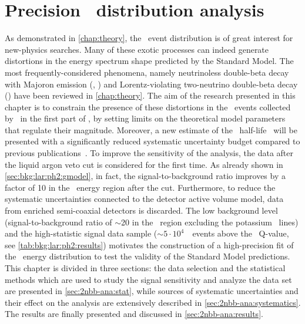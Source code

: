 
\chapter{\texorpdfstring{Precision \nnbb\ distribution analysis}{Precision 2νββ distribution analysis}}%
\label{chap:2nbb-ana}

As demonstrated in \cref{chap:theory}, the \nnbb\ event distribution is of
great interest for new-physics searches. Many of these exotic processes can indeed
generate distortions in the energy spectrum shape predicted by the Standard Model. The
most frequently-considered phenomena, namely neutrinoless double-beta decay with Majoron
emission (\onbbx, \onbbxx) and Lorentz-violating two-neutrino double-beta decay (\nnbblv)
have been reviewed in \cref{chap:theory}. The aim of the research presented in this
chapter is to constrain the presence of these distortions in the \nnbb\ events collected
by \gerda\ in the first part of \phasetwo, by setting limits on the theoretical model
parameters that regulate their magnitude. Moreover, a new estimate of the \nnbb\ half-life
\thalftwo\ will be presented with a significantly reduced systematic uncertainty budget
compared to previous publications~\cite{Agostini2015a}. To improve the sensitivity of the
analysis, the data after the liquid argon veto cut is considered for the first time. As
already shown in \cref{sec:bkg:lar:ph2:gmodel}, in fact, the signal-to-background ratio
improves by a factor of 10 in the \nnbb\ energy region after the cut. Furthermore, to
reduce the systematic uncertainties connected to the detector active volume model, data
from enriched semi-coaxial detectors is discarded. The low background level
(signal-to-background ratio of $\sim$20 in the \nnbb\ region excluding the potassium \g\
lines) and the high-statistic signal data sample ($\sim$$5 \cdot 10^{4}$~\nnbb\ events
above the \Arl\ Q-value, see \cref{tab:bkg:lar:ph2:results}) motivates the construction of
a high-precision fit of the \nnbb\ energy distribution to test the validity of the
Standard Model predictions.
\newpar
This chapter is divided in three sections: the data selection and the statistical methods
which are used to study the signal sensitivity and analyze the data set are presented in
\cref{sec:2nbb-ana:stat}, while sources of systematic uncertainties and their effect on
the analysis are extensively described in \cref{sec:2nbb-ana:systematics}. The
results are finally presented and discussed in \cref{sec:2nbb-ana:results}.

